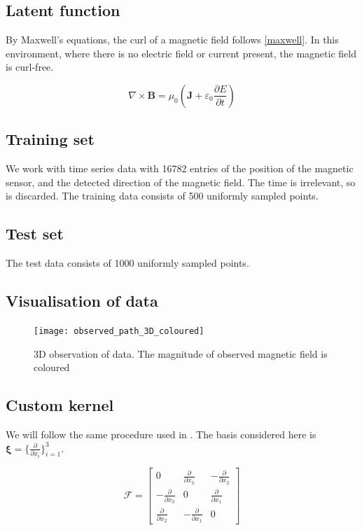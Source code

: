 \documentclass[12pt,a4paper,twoside]{report}
\theoremstyle{definition}
\begin{document}
\subsection{Latent function}
By Maxwell's equations, the curl of a magnetic field follows \cref{maxwell}. In this environment, where there is no electric field or current present, the magnetic field is curl-free.

\begin{equation}\label{maxwell}
	\nabla\times \mathbf B = \mu_0\left( \mathbf J+\varepsilon_0 \frac{\partial E}{\partial t}  \right) 
\end{equation}

\subsection{Training set}
We work with time series data with 16782 entries of the position of the magnetic sensor, and the detected direction of the magnetic field. The time is irrelevant, so is discarded. The training data consists of 500 uniformly sampled points.

\subsection{Test set}
The test data consists of 1000 uniformly sampled points.

\subsection{Visualisation of data}
\begin{figure}[ht]
	\centering
	\texttt{[image: observed\_path\_3D\_coloured]}
	\caption[3D data]{3D observation of data. The magnitude of observed magnetic field is coloured}
\end{figure}

\subsection{Custom kernel}
We will follow the same procedure used in . The basis considered here is $\boldsymbol \xi = \{\frac{\partial}{\partial x_i}\}_{i=1}^3$.

$$\mathscr F = \begin{bmatrix} 0 & \frac{\partial}{\partial x_3} & -\frac{\partial}{\partial x_2} \\ -\frac{\partial}{\partial x_3} & 0 & \frac{\partial}{\partial x_1} \\ \frac{\partial}{\partial x_2} & -\frac{\partial}{\partial x_1} & 0 \end{bmatrix}$$
\end{document}
